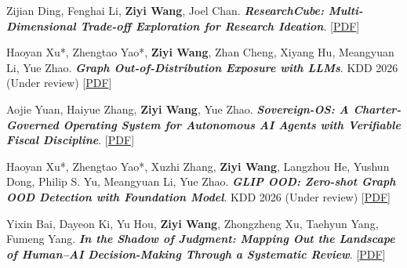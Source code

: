 \begin{enumerate}[leftmargin=0.35in, label={[\arabic*]}]
    \item \label{pub:dim} \small{Zijian Ding, Fenghai Li, \textbf{Ziyi Wang}, Joel Chan. \textbf{\textit{ResearchCube: Multi-Dimensional Trade-off Exploration for Research Ideation}}. [\href{https://arxiv.org/pdf/2604.11538}{PDF}]}    
    
    \item \label{pub:graph-ood} \small{Haoyan Xu*, Zhengtao Yao*, \textbf{Ziyi Wang}, Zhan Cheng, Xiyang Hu, Meangyuan Li, Yue Zhao. \textbf{\textit{Graph Out-of-Distribution Exposure with LLMs}}. KDD 2026 (Under review) [\href{https://arxiv.org/pdf/2504.21198?}{PDF}]}


    

    \item \label{pub:sovereign-os} \small{Aojie Yuan, Haiyue Zhang, \textbf{Ziyi Wang}, Yue Zhao. \textbf{\textit{Sovereign-OS: A Charter-Governed Operating System for Autonomous AI Agents with Verifiable Fiscal Discipline}}. [\href{https://arxiv.org/abs/2603.14011}{PDF}]}    
    
    \item \label{pub:glip} \small{Haoyan Xu*, Zhengtao Yao*, Xuzhi Zhang, \textbf{Ziyi Wang}, Langzhou He, Yushun Dong, Philip S. Yu, Meangyuan Li, Yue Zhao. \textbf{\textit{GLIP OOD: Zero-shot Graph OOD Detection with Foundation Model}}. KDD 2026 (Under review) [\href{https://arxiv.org/pdf/2504.21186}{PDF}]}

        
    \item \label{pub:judgment} \small{Yixin Bai, Dayeon Ki, Yu Hou, \textbf{Ziyi Wang}, Zhongzheng Xu, Taehyun Yang, Fumeng Yang. \textbf{\textit{In the Shadow of Judgment: Mapping Out the Landscape of Human–AI Decision-Making Through a Systematic Review}}. [\href{https://hal.science/hal-05499178/}{PDF}]}

 
    
    

    
\end{enumerate}